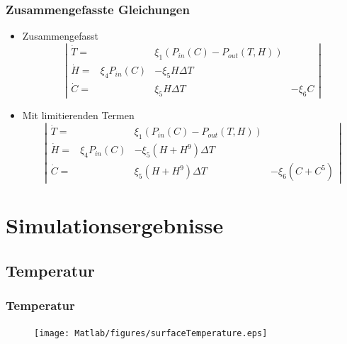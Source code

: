 \documentclass[english, aspectratio=169]{beamer}
\begin{document}
\begin{frame}
\frametitle{Zusammengefasste Gleichungen}
\begin{itemize}
	\item[] Zusammengefasst
\begin{equation}
\left|
\begin{matrix}
\dot{T} = &  & \xi_1 \left(P_{in}(C) - P_{out}(T, H) \right) &\\
\dot{H} = & \xi_4 P_{in}(C) & - \xi_5 H \Delta T & \\
\dot{C} = &                 &   \xi_5 H \Delta T & - \xi_6 C
\end{matrix}
\right|
\end{equation}
	\pause
	\item[] Mit limitierenden Termen
\begin{equation}
\left|
\begin{matrix}
\dot{T} = & & \xi_1 \left(P_{in}(C) - P_{out}(T, H) \right) &\\
\dot{H} = & \xi_4 P_{in}(C) & - \xi_5 (H + H^9) \Delta T & \\
\dot{C} = &                 &   \xi_5 (H + H^9) \Delta T & - \xi_6 (C + C^5)
\end{matrix}
\right|
\end{equation}	
	

\end{itemize}
\end{frame}

\section{Simulationsergebnisse}

\subsection{Temperatur}
\begin{frame}
	\frametitle{Temperatur}
		\begin{figure}
			\texttt{[image: Matlab/figures/surfaceTemperature.eps]}
		\end{figure}
\end{frame}
\end{document}

